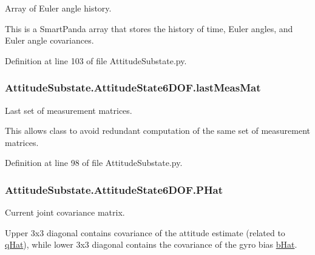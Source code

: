 Array of Euler angle history. 

This is a Smart\+Panda array that stores the history of time, Euler angles, and Euler angle covariances. 

Definition at line 103 of file Attitude\+Substate.\+py.

\subsubsection[{\texorpdfstring{last\+Meas\+Mat}{lastMeasMat}}]{\setlength{\rightskip}{0pt plus 5cm}Attitude\+Substate.\+Attitude\+State6\+D\+O\+F.\+last\+Meas\+Mat}\hypertarget{classAttitudeSubstate_1_1AttitudeState6DOF_ae23a47fae330703aa8a50b207275c9b0}{}\label{classAttitudeSubstate_1_1AttitudeState6DOF_ae23a47fae330703aa8a50b207275c9b0}


Last set of measurement matrices. 

This allows class to avoid redundant computation of the same set of measurement matrices. 

Definition at line 98 of file Attitude\+Substate.\+py.

\subsubsection[{\texorpdfstring{P\+Hat}{PHat}}]{\setlength{\rightskip}{0pt plus 5cm}Attitude\+Substate.\+Attitude\+State6\+D\+O\+F.\+P\+Hat}\hypertarget{classAttitudeSubstate_1_1AttitudeState6DOF_a6aac27efa4d5962865f7d3f701c919ab}{}\label{classAttitudeSubstate_1_1AttitudeState6DOF_a6aac27efa4d5962865f7d3f701c919ab}


Current joint covariance matrix. 

Upper 3x3 diagonal contains covariance of the attitude estimate (related to \hyperlink{classAttitudeSubstate_1_1AttitudeState6DOF_a36a58a47280151dd544762d9a1d5c35d}{q\+Hat}), while lower 3x3 diagonal contains the covariance of the gyro bias \hyperlink{classAttitudeSubstate_1_1AttitudeState6DOF_a1b8eff7c89a7a03875dc04263da7ec18}{b\+Hat}. 


